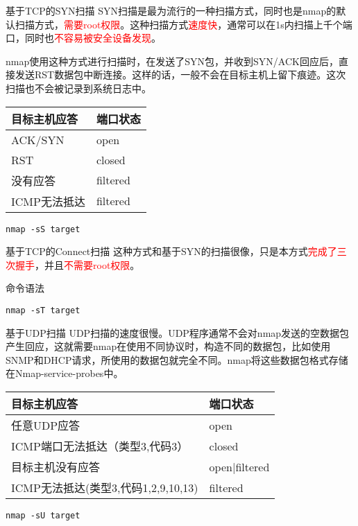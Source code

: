 \documentclass{beamer}
\begin{document}
\begin{frame}[fragile]{基于TCP的SYN扫描}
SYN扫描是最为流行的一种扫描方式，同时也是nmap的默认扫描方式，\textcolor{red}{需要root权限}。这种扫描方式\textcolor{red}{速度快}，通常可以在1s内扫描上千个端口，同时也\textcolor{red}{不容易被安全设备发现}。

nmap使用这种方式进行扫描时，在发送了SYN包，并收到SYN/ACK回应后，直接发送RST数据包中断连接。这样的话，一般不会在目标主机上留下痕迹。这次扫描也不会被记录到系统日志中。
\begin{table}
\begin{tabular}{ll}
\toprule
\textbf{目标主机应答}&\textbf{端口状态}\\
\midrule
ACK/SYN&open\\
RST&closed\\
没有应答&filtered\\
ICMP无法抵达&filtered\\
\bottomrule
\end{tabular}
\end{table}
\begin{example}[命令语法]
\begin{verbatim}
nmap -sS target
\end{verbatim}
\end{example}
\end{frame}
\begin{frame}[fragile]{基于TCP的Connect扫描}
这种方式和基于SYN的扫描很像，只是本方式\textcolor{red}{完成了三次握手}，并且\textcolor{red}{不需要root权限}。
\begin{block}{命令语法}
\begin{verbatim}
nmap -sT target
\end{verbatim}
\end{block}
\end{frame}

\begin{frame}[fragile]{基于UDP扫描}
UDP扫描的速度很慢。UDP程序通常不会对nmap发送的空数据包产生回应，这就需要nmap在使用不同协议时，构造不同的数据包，比如使用SNMP和DHCP请求，所使用的数据包就完全不同。nmap将这些数据包格式存储在Nmap-service-probes中。
\begin{table}
\begin{tabular}{ll}
\toprule
\textbf{目标主机应答}&\textbf{端口状态}\\
\midrule
任意UDP应答&open\\
ICMP端口无法抵达（类型3,代码3）&closed\\
目标主机没有应答&open|filtered\\
ICMP无法抵达(类型3,代码1,2,9,10,13)&filtered\\
\bottomrule
\end{tabular}
\end{table}
\begin{example}[命令语法]
\begin{verbatim}
nmap -sU target
\end{verbatim}
\end{example}
\end{frame}
\end{document}
